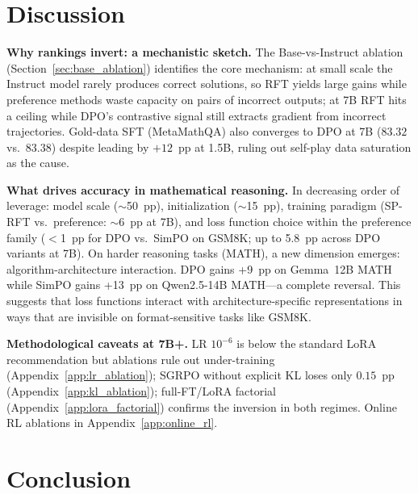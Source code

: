 \documentclass{article}
\newcommand{\sprft}{SP-RFT}
\begin{document}
\section{Discussion}
\label{sec:discussion}

\textbf{Why rankings invert: a mechanistic sketch.}
The Base-vs-Instruct ablation (Section~\ref{sec:base_ablation}) identifies the core mechanism: at small scale the Instruct model rarely produces correct solutions, so RFT yields large gains while preference methods waste capacity on pairs of incorrect outputs; at 7B RFT hits a ceiling while DPO's contrastive signal still extracts gradient from incorrect trajectories. Gold-data SFT (MetaMathQA) also converges to DPO at 7B ($83.32$ vs.\ $83.38$) despite leading by $+12$~pp at 1.5B, ruling out self-play data saturation as the cause.

\textbf{What drives accuracy in mathematical reasoning.}
In decreasing order of leverage: model scale (${\sim}$50~pp), initialization (${\sim}$15~pp), training paradigm (\sprft{} vs.\ preference: ${\sim}$6~pp at 7B), and loss function choice within the preference family ($<$1~pp for DPO vs.\ SimPO on GSM8K; up to 5.8~pp across DPO variants at 7B).
On harder reasoning tasks (MATH), a new dimension emerges: algorithm-architecture interaction. DPO gains +9~pp on Gemma~12B MATH while SimPO gains +13~pp on Qwen2.5-14B MATH---a complete reversal. This suggests that loss functions interact with architecture-specific representations in ways that are invisible on format-sensitive tasks like GSM8K.

\textbf{Methodological caveats at 7B+.}
LR $10^{-6}$ is below the standard LoRA recommendation but ablations rule out under-training (Appendix~\ref{app:lr_ablation}); SGRPO without explicit KL loses only $0.15$~pp (Appendix~\ref{app:kl_ablation}); full-FT/LoRA factorial (Appendix~\ref{app:lora_factorial}) confirms the inversion in both regimes. Online RL ablations in Appendix~\ref{app:online_rl}.

\section{Conclusion}
\end{document}
